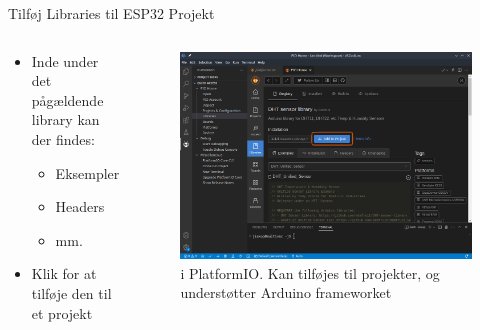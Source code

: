 \documentclass[aspectratio=169]{beamer}
\begin{document}
\begin{frame}{Tilføj Libraries til ESP32 Projekt}
\begin{columns}
	\begin{column}{0.5\textwidth}
		\begin{textBox}
			\begin{itemize}
				\item Inde under det pågældende library kan der findes:
				\begin{itemize}
					\item Eksempler
					\item Headers
					\item mm.
				\end{itemize}
				\item Klik  for at tilføje den til et projekt
			\end{itemize}
		\end{textBox}
	\end{column}
	\begin{column}{0.5\textwidth}
		\begin{figure}
  			\includegraphics[width=\textwidth,keepaspectratio=true]{assets/pictures/pio-libraries-2.png}
  			\caption{ i PlatformIO. Kan tilføjes til projekter, og understøtter Arduino frameworket}
  			\label{fig:pio-libraries-2}
		\end{figure}
	\end{column}
\end{columns}
\end{frame}
\end{document}
